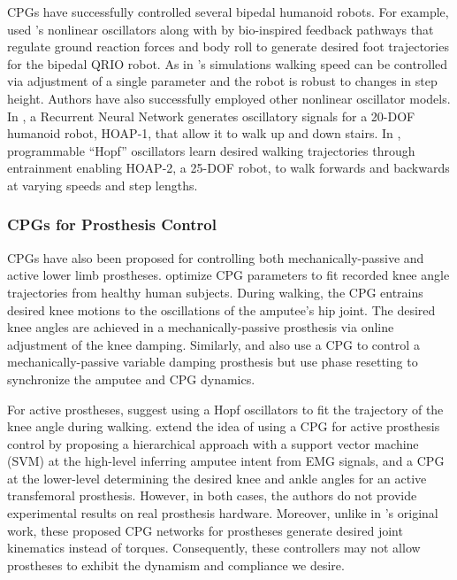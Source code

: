 CPGs have successfully controlled several bipedal humanoid robots. For example,
\citet{endo2005experimental} used \citeauthor{matsuoka1987mechanisms}'s
nonlinear oscillators along with by bio-inspired feedback pathways that regulate
ground reaction forces and body roll to generate desired foot trajectories for
the bipedal QRIO robot. As in \citeauthor{taga1991self}'s simulations walking
speed can be controlled via adjustment of a single parameter and the robot is
robust to changes in step height. Authors have also successfully employed other
nonlinear oscillator models. In \citet{shan2002neural}, a Recurrent Neural
Network generates oscillatory signals for a 20-DOF humanoid robot, HOAP-1, that
allow it to walk up and down stairs. In \citet{righetti2006programmable},
programmable ``Hopf'' oscillators \citep{righetti2006dynamic} learn desired
walking trajectories through entrainment enabling HOAP-2, a 25-DOF robot, to
walk forwards and backwards at varying speeds and step lengths.  

\subsubsection{CPGs for Prosthesis Control}
CPGs have also been proposed for controlling both mechanically-passive and
active lower limb prostheses.  \citet{nandi2009development} optimize CPG
parameters to fit recorded knee angle trajectories from healthy human subjects.
During walking, the CPG entrains desired knee motions to the oscillations of the
amputee's hip joint. The desired knee angles are achieved in a
mechanically-passive prosthesis via online adjustment of the knee damping.
Similarly, \citet{torrealba2010through} and \citet{mora2012cybernetic} also use
a CPG to control a mechanically-passive variable damping prosthesis but use
phase resetting to synchronize the amputee and CPG dynamics. 

For active prostheses, \citet{geng2012design} suggest using a Hopf oscillators
to fit the trajectory of the knee angle during walking. \citet{guo2010study}
extend the idea of using a CPG for active prosthesis control by proposing a
hierarchical approach with a support vector machine (SVM) at the high-level
inferring amputee intent from EMG signals, and a CPG at the lower-level
determining the desired knee and ankle angles for an active transfemoral
prosthesis. However, in both cases, the authors do not provide experimental
results on real prosthesis hardware. Moreover, unlike in
\citeauthor{taga1991self}'s original work, these proposed CPG networks for
prostheses generate desired joint kinematics instead of torques. Consequently,
these controllers may not allow prostheses to exhibit the dynamism and
compliance we desire.

